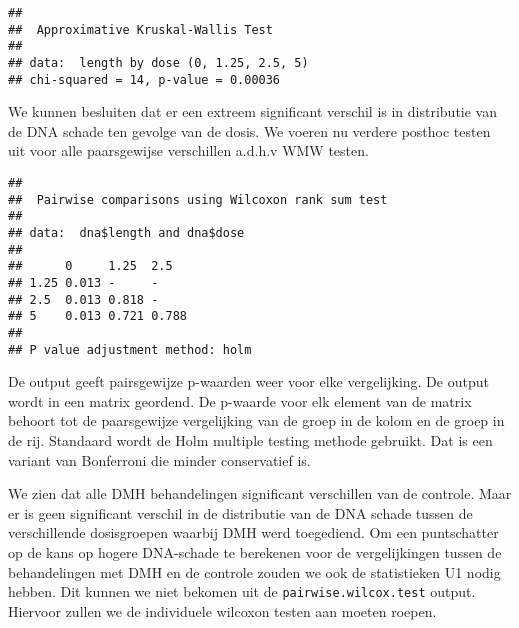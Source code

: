 \documentclass[12pt,dutch,coursenotes]{book}
\newenvironment{Shaded}{\begin{snugshade}}{\end{snugshade}}
\newcommand{\KeywordTok}[1]{\textcolor[rgb]{0.13,0.29,0.53}{\textbf{#1}}}
\newcommand{\StringTok}[1]{\textcolor[rgb]{0.31,0.60,0.02}{#1}}
\newcommand{\OperatorTok}[1]{\textcolor[rgb]{0.81,0.36,0.00}{\textbf{#1}}}
\newcommand{\NormalTok}[1]{#1}
\theoremstyle{definition}
\theoremstyle{definition}
\theoremstyle{definition}
\theoremstyle{remark}
\begin{document}
\begin{verbatim}
## 
##  Approximative Kruskal-Wallis Test
## 
## data:  length by dose (0, 1.25, 2.5, 5)
## chi-squared = 14, p-value = 0.00036
\end{verbatim}

We kunnen besluiten dat er een extreem significant verschil is in
distributie van de DNA schade ten gevolge van de dosis. We voeren nu
verdere posthoc testen uit voor alle paarsgewijse verschillen a.d.h.v
WMW testen.

\begin{Shaded}
\end{Shaded}

\begin{verbatim}
## 
##  Pairwise comparisons using Wilcoxon rank sum test 
## 
## data:  dna$length and dna$dose 
## 
##      0     1.25  2.5  
## 1.25 0.013 -     -    
## 2.5  0.013 0.818 -    
## 5    0.013 0.721 0.788
## 
## P value adjustment method: holm
\end{verbatim}

De output geeft pairsgewijze p-waarden weer voor elke vergelijking. De
output wordt in een matrix geordend. De p-waarde voor elk element van de
matrix behoort tot de paarsgewijze vergelijking van de groep in de kolom
en de groep in de rij. Standaard wordt de Holm multiple testing methode
gebruikt. Dat is een variant van Bonferroni die minder conservatief is.

We zien dat alle DMH behandelingen significant verschillen van de
controle. Maar er is geen significant verschil in de distributie van de
DNA schade tussen de verschillende dosisgroepen waarbij DMH werd
toegediend. Om een puntschatter op de kans op hogere DNA-schade te
berekenen voor de vergelijkingen tussen de behandelingen met DMH en de
controle zouden we ook de statistieken U1 nodig hebben. Dit kunnen we
niet bekomen uit de \texttt{pairwise.wilcox.test} output. Hiervoor
zullen we de individuele wilcoxon testen aan moeten roepen.
\end{document}
